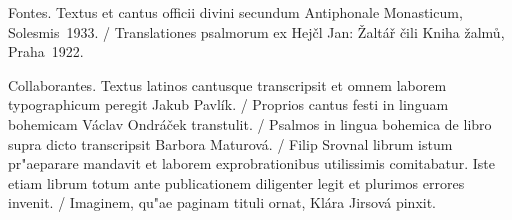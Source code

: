 \documentclass[a4paper, twoside, 12pt]{article}
\begin{document}
\vfill

\pagebreak

\cantusSineNeumas

\capitulumDiei

\responsoriumAdVesperas

\vfill

\begin{multicols}{3}
\nlfont
\translatioHymnusVesp
\end{multicols}

\pagebreak

\hymnusAdVesperas

\vfill

\versiculusDiei

\pagebreak

\cantusCumNeumis


  

\cantusSineNeumas




\vfill

\pagebreak

\label{oratioetc}

\anteOrationem

\pagebreak

\oratioDiei

\translatioOrationis

\benedicamusDomino

\inFineHorarum

\pagebreak

\pagestyle{empty}

Fontes. 
Textus et cantus officii divini secundum 
Antiphonale Monasticum, Solesmis~1933. /
Translationes psalmorum ex
Hejčl Jan: Žaltář čili Kniha žalmů, Praha~1922.

Collaborantes.
Textus latinos cantusque transcripsit et omnem laborem typographicum peregit
Jakub Pavlík. /
Proprios cantus festi in linguam bohemicam Václav Ondráček transtulit. /
Psalmos in lingua bohemica de libro supra dicto transcripsit
Barbora Maturová. /
Filip Srovnal librum istum pr"aeparare mandavit et laborem exprobrationibus
utilissimis comitabatur. Iste etiam librum totum ante publicationem
diligenter legit et plurimos errores invenit. /
Imaginem, qu"ae paginam tituli ornat, Klára Jirsová pinxit.
\end{document}
